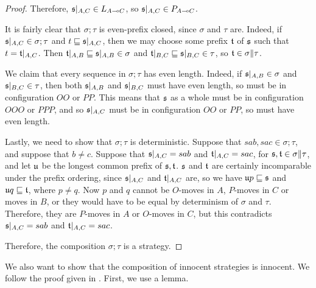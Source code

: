 \documentclass[11pt]{report}
\begin{document}
\begin{proof}
  Therefore, $\mathfrak s\vert_{A,C}\in L_{A\multimap C}$, so $\mathfrak s\vert_{A,C}\in P_{A\multimap C}$.

  It is fairly clear that $\sigma;\tau$ is even-prefix closed, since $\sigma$ and $\tau$ are.  
  Indeed, if $\mathfrak s\vert_{A,C}\in\sigma;\tau$ and $t\sqsubseteq\mathfrak s\vert_{A,C}$, then we may choose some prefix $\mathfrak t$ of $\mathfrak s$ such that $t=\mathfrak t\vert_{A,C}$.  
  Then $\mathfrak t\vert_{A,B}\sqsubseteq\mathfrak s\vert_{A,B}\in\sigma$ and $\mathfrak t\vert_{B,C}\sqsubseteq\mathfrak s\vert_{B,C}\in\tau$, so $\mathfrak t\in\sigma\|\tau$.

  We claim that every sequence in $\sigma;\tau$ has even length.  
  Indeed, if $\mathfrak s\vert_{A,B}\in\sigma$ and $\mathfrak s\vert_{B,C}\in\tau$, then both $\mathfrak s\vert_{A,B}$ and $\mathfrak s\vert_{B,C}$ must have even length, so must be in configuration $OO$ or $PP$.  
  This means that $\mathfrak s$ as a whole must be in configuration $OOO$ or $PPP$, and so $\mathfrak s\vert_{A,C}$ must be in configuration $OO$ or $PP$, so must have even length.

  Lastly, we need to show that $\sigma;\tau$ is deterministic.  
  Suppose that $sab,sac\in\sigma;\tau$, and suppose that $b\ne c$.  
  Suppose that $\mathfrak s\vert_{A,C}=sab$ and $\mathfrak t\vert_{A,C}=sac$, for $\mathfrak s,\mathfrak t\in\sigma\|\tau$, and let $\mathfrak u$ be the longest common prefix of $\mathfrak s,\mathfrak t$.
  $\mathfrak s$ and $\mathfrak t$ are certainly incomparable under the prefix ordering, since $\mathfrak s\vert_{A,C}$ and $\mathfrak t\vert_{A,C}$ are, so we have $\mathfrak u p\sqsubseteq \mathfrak s$ and $\mathfrak u q\sqsubseteq \mathfrak t$, where $p\ne q$.
  Now $p$ and $q$ cannot be $O$-moves in $A$, $P$-moves in $C$ or moves in $B$, or they would have to be equal by determinism of $\sigma$ and $\tau$.  
  Therefore, they are $P$-moves in $A$ or $O$-moves in $C$, but this contradicts $\mathfrak s\vert_{A,C}=sab$ and $\mathfrak t\vert_{A,C}=sac$.

  Therefore, the composition $\sigma;\tau$ is a strategy.  
\end{proof}

We also want to show that the composition of innocent strategies is innocent.
We follow the proof given in \cite{Harmer2006InnocentGS}.  
First, we use a lemma.
\end{document}
